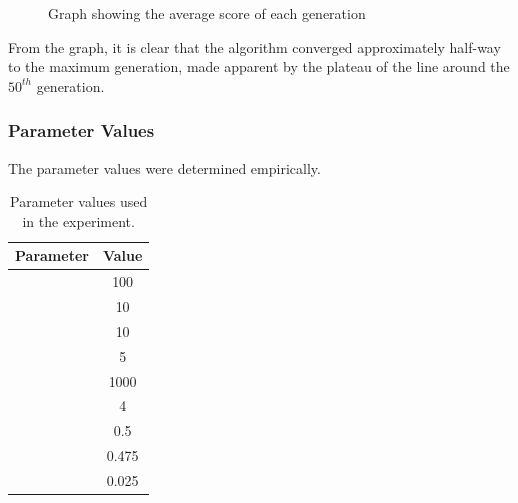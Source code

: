 \documentclass[a4paper,12pt]{article}
\begin{document}
{\begin{figure}[h!]
\begin{center}
                    \end{center}
                    \caption{Graph showing the average score of each generation}
                \end{figure} 
                \noindent From the graph, it is clear that the algorithm converged approximately half-way to the maximum generation, made apparent by the
                plateau of the line around the $50^{th}$ generation. 
            } 
        \subsubsection*{Parameter Values}
            \par{
                The parameter values were determined empirically.
                \begin{table}[h!]
                    \centering
                        \small 
                        \begin{tabular}{ | l | c | }

                            \hline
                            \textbf{Parameter} & \textbf{Value} \\
                            \hline  
                            \nameref{subsubsec:mg} & 100 \\ 
                            \nameref{subsubsec:kf} & 10 \\ 
                            \nameref{subsubsec:mmd} & 10 \\ 
                            \nameref{subsubsec:cmd} & 5 \\ 
                            \nameref{subsubsec:ps} & 1000 \\ 
                            \nameref{subsubsec:ts} & 4 \\ 
                            \nameref{subsubsec:car} & 0.5 \\ 
                            \nameref{subsubsec:mar} & 0.475 \\ 
                            \nameref{subsubsec:har} & 0.025 \\
                            \hline 
                        \end{tabular}
                        \caption{Parameter values used in the experiment.} 
                \end{table} 
            }
\end{document}
